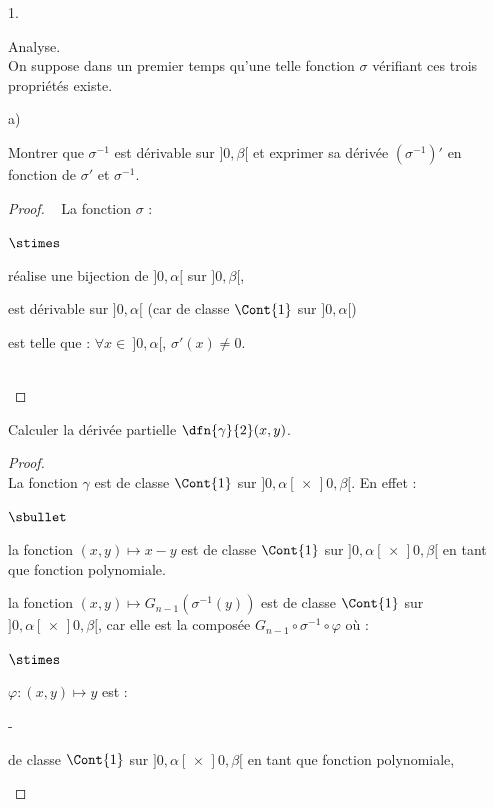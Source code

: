 \documentclass[11pt]{article}%
\begin{document}
\begin{noliste}{1.}
  \setlength{\itemsep}{4mm}
  \setcounter{enumi}{5}
  \item Analyse.\\
  On suppose dans un premier temps qu'une telle fonction $\sigma$ 
  vérifiant ces trois propriétés existe.
  \begin{noliste}{a)}
    \setlength{\itemsep}{2mm}
    \item Montrer que $\sigma^{-1}$ est dérivable sur $]0,\beta[$ et 
    exprimer sa dérivée $(\sigma^{-1})'$ en fonction de $\sigma'$
    et $\sigma^{-1}$.
    
    \begin{proof}~
      La fonction $\sigma$ :
      \begin{noliste}{$\stimes$}
	\item réalise une bijection de $]0,\alpha[$ sur $]0,\beta[$,
	\item est dérivable sur $]0,\alpha[$ (car de classe $\Cont{1}$ 
	sur $]0,\alpha[$)
	\item est telle que : $\forall x \in \ ]0,\alpha[$, 
	$\sigma'(x) \neq 0$.
      \end{noliste}
      \conc{Alors $\sigma^{-1}$ est dérivable sur $]0,\beta[$ et 
      $(\sigma^{-1})' = \dfrac{1}{\sigma' \circ \sigma^{-1}}$.}
      
      ~\\[-1.4cm]
    \end{proof}
    
    

    
    \item Calculer la dérivée partielle $\dfn{\gamma}{2}(x, y)$.
    
    \begin{proof}~\\
      La fonction $\gamma$ est de classe $\Cont{1}$ sur 
      $]0,\alpha[ \, \times \, ]0, \beta[$. En effet :
      \begin{noliste}{$\sbullet$}
	\item la fonction $(x,y) \mapsto x-y$ est de classe $\Cont{1}$
	sur $]0,\alpha[ \, \times \, ]0, \beta[$ en tant que 
	fonction polynomiale.
	
	\item la fonction $(x,y) \mapsto G_{n-1}(\sigma^{-1}(y))$
	est de classe $\Cont{1}$ sur $]0,\alpha[ \, \times \, ]0, 
	\beta[$, car elle est la composée $G_{n-1} \circ \sigma^{-1}
	\circ \varphi$ où : 
	\begin{noliste}{$\stimes$}
	  \item $\varphi:(x,y) \mapsto y$ est :~\\[-.6cm]
	\end{noliste}
	  \begin{liste}{-}
	    \item de classe $\Cont{1}$ sur $]0,\alpha[ \, \times \, ]0, 
	    \beta[$ en tant que fonction polynomiale,
	    

\end{liste}
\end{noliste}
\end{proof}
\end{noliste}
\end{noliste}
\end{document}

